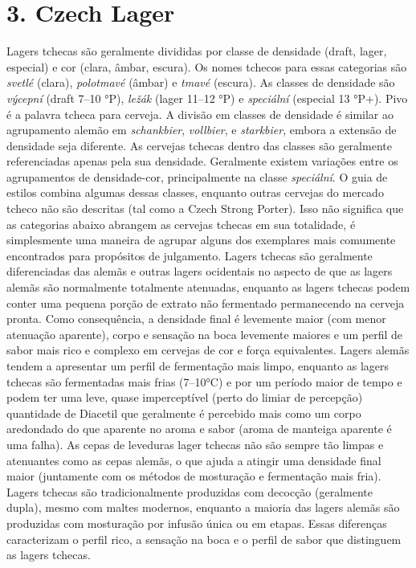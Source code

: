 \section*{3. Czech Lager}

Lagers tchecas são geralmente divididas por classe de densidade (draft, lager, especial) e cor (clara, âmbar, escura). Os nomes tchecos para essas categorias são \textit{svetlé} (clara), \textit{polotmavé} (âmbar) e \textit{tmavé} (escura). As classes de densidade são \textit{výcepní} (draft 7–10 °P), \textit{ležák} (lager 11–12 °P) e \textit{speciální} (especial 13 °P+). Pivo é a palavra tcheca para cerveja. A divisão em classes de densidade é similar ao agrupamento alemão em \textit{schankbier}, \textit{vollbier}, e \textit{starkbier}, embora a extensão de densidade seja diferente. As cervejas tchecas dentro das classes são geralmente referenciadas apenas pela sua densidade. Geralmente existem variações entre os agrupamentos de densidade-cor, principalmente na classe \textit{speciální}. O guia de estilos combina algumas dessas classes, enquanto outras cervejas do mercado tcheco não são descritas (tal como a Czech Strong Porter). Isso não significa que as categorias abaixo abrangem as cervejas tchecas em sua totalidade, é simplesmente uma maneira de agrupar alguns dos exemplares mais comumente encontrados para propósitos de julgamento. Lagers tchecas são geralmente diferenciadas das alemãs e outras lagers ocidentais no aspecto de que as lagers alemãs são normalmente totalmente atenuadas, enquanto as lagers tchecas podem conter uma pequena porção de extrato não fermentado permanecendo na cerveja pronta. Como consequência, a densidade final é levemente maior (com menor atenuação aparente), corpo e sensação na boca levemente maiores e um perfil de sabor mais rico e complexo em cervejas de cor e força equivalentes. Lagers alemãs tendem a apresentar um perfil de fermentação mais limpo, enquanto as lagers tchecas são fermentadas mais frias (7–10°C) e por um período maior de tempo e podem ter uma leve, quase imperceptível (perto do limiar de percepção) quantidade de Diacetil que geralmente é percebido mais como um corpo aredondado do que aparente no aroma e sabor (aroma de manteiga aparente é uma falha). As cepas de leveduras lager tchecas não são sempre tão limpas e atenuantes como as cepas alemãs, o que ajuda a atingir uma densidade final maior (juntamente com os métodos de mosturação e fermentação mais fria). Lagers tchecas são tradicionalmente produzidas com decocção (geralmente dupla), mesmo com maltes modernos, enquanto a maioria das lagers alemãs são produzidas com mosturação por infusão única ou em etapas. Essas diferenças caracterizam o perfil rico, a sensação na boca e o perfil de sabor que distinguem as lagers tchecas.
